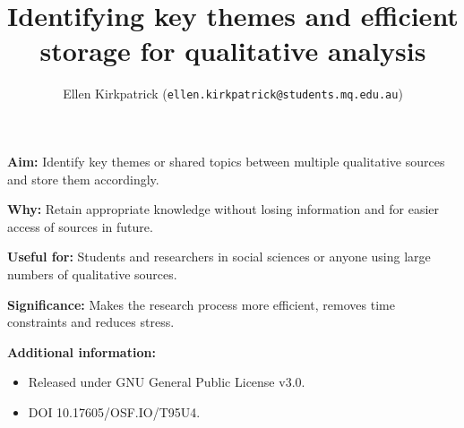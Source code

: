 \documentclass[unknownkeysallowed,usepdftitle=false, aspectratio=169, parskip=full]{beamer}
\title{Identifying key themes and efficient storage for qualitative analysis}
\author{Ellen Kirkpatrick\inst{1} (\texttt{ellen.kirkpatrick@students.mq.edu.au}) \inst{1}}
\institute{\inst{1}Macquarie University, Sydney, NSW}
\newcommand{\secvariable}{nothing}
\newcommand{\mysection}[1]{\renewcommand{\secvariable}{#1}
}
\begin{document}
\mysection{abstract}
\begin{frame}\label{\secvariable}


\parbox{\linewidth}{


\textbf{Aim:} Identify key themes or shared topics between multiple qualitative sources and store them accordingly. 
\vspace{12pt}

\textbf{Why:} Retain appropriate knowledge without losing information and for easier access of sources in future. 
\vspace{12pt}

\textbf{Useful for:} Students and researchers in social sciences or anyone using large numbers of qualitative sources.
\vspace{12pt}

\textbf{Significance:} Makes the research process more efficient, removes time constraints and reduces stress.
\vspace{12pt}

\textbf{Additional information:} 
\begin{itemize}
    \item Released under GNU General Public License v3.0.
    \item DOI 10.17605/OSF.IO/T95U4.
    \end{itemize}
 
}
 
  
\end{frame}
\end{document}

